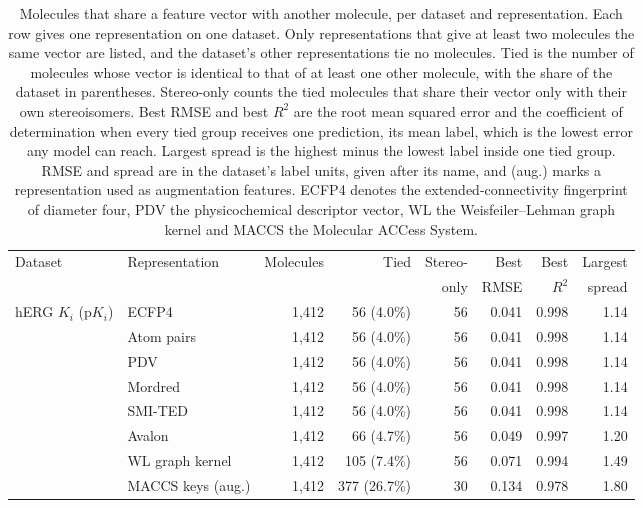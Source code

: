 \begin{table}[htbp]
\centering
\small
\setlength{\tabcolsep}{4pt}
\caption[Molecules that share a feature vector with another molecule.]{Molecules that share a feature vector with another molecule, per dataset and representation. Each row gives one representation on one dataset. Only representations that give at least two molecules the same vector are listed, and the dataset's other representations tie no molecules. Tied is the number of molecules whose vector is identical to that of at least one other molecule, with the share of the dataset in parentheses. Stereo-only counts the tied molecules that share their vector only with their own stereoisomers. Best RMSE and best $R^2$ are the root mean squared error and the coefficient of determination when every tied group receives one prediction, its mean label, which is the lowest error any model can reach. Largest spread is the highest minus the lowest label inside one tied group. RMSE and spread are in the dataset's label units, given after its name, and (aug.) marks a representation used as augmentation features. ECFP4 denotes the extended-connectivity fingerprint of diameter four, PDV the physicochemical descriptor vector, WL the Weisfeiler--Lehman graph kernel and MACCS the Molecular ACCess System.}
\label{tab:flaws:ties}
\begin{adjustbox}{max width=\textwidth}
\begin{tabular}{llrrrrrr}
\toprule
Dataset & Representation & Molecules & Tied & Stereo- & Best & Best & Largest \\
 & & & & only & RMSE & $R^2$ & spread \\
\midrule
hERG $K_i$ (p$K_i$) & ECFP4 & 1,412 & 56 (4.0\%) & 56 & 0.041 & 0.998 & 1.14 \\
 & Atom pairs & 1,412 & 56 (4.0\%) & 56 & 0.041 & 0.998 & 1.14 \\
 & PDV & 1,412 & 56 (4.0\%) & 56 & 0.041 & 0.998 & 1.14 \\
 & Mordred & 1,412 & 56 (4.0\%) & 56 & 0.041 & 0.998 & 1.14 \\
 & SMI-TED & 1,412 & 56 (4.0\%) & 56 & 0.041 & 0.998 & 1.14 \\
 & Avalon & 1,412 & 66 (4.7\%) & 56 & 0.049 & 0.997 & 1.20 \\
 & WL graph kernel & 1,412 & 105 (7.4\%) & 56 & 0.071 & 0.994 & 1.49 \\
 & MACCS keys (aug.) & 1,412 & 377 (26.7\%) & 30 & 0.134 & 0.978 & 1.80 \\

\end{tabular}
\end{adjustbox}
\end{table}
